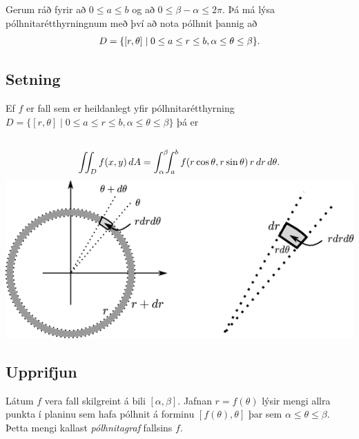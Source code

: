 \documentclass[a4paper,10pt,icelandic]{sphinxmanual}
\begin{document}
Gerum ráð fyrir að \(0\leq a\leq b\) og að
\(0\leq\beta-\alpha\leq
2\pi\). Þá má lýsa pólhnitarétthyrningnum með því að nota pólhnit þannig
að
\begin{gather}
\begin{split}\displaystyle D=\{[r,\theta]\mid 0\leq a\leq r\leq b, \alpha\leq \theta\leq\beta\}.\end{split}\notag
\end{gather}

\subsection{Setning}
\label{Kafli4:id11}
Ef \(f\) er fall sem er heildanlegt yfir pólhnitarétthyrning
\(D=\{[r,\theta]\mid 0\leq a\leq r\leq b, \alpha\leq \theta\leq\beta\}\)
þá er
\begin{gather}
\begin{split}\displaystyle\end{split}\notag\\\begin{split}\int\!\!\!\int_D f(x,y)\,dA=\int_\alpha^\beta\!\!\!\int_{a}^{b}
f(r\cos\theta,r\sin\theta)\,r\,dr\, d\theta.\end{split}\notag
\end{gather}
{\hfill\includegraphics[width=0.900\linewidth]{polarelement.png}\hfill}


\subsection{Upprifjun}
\label{Kafli4:id12}
Látum \(f\) vera fall skilgreint á bili \([\alpha,\beta]\).
Jafnan \(r=f(\theta)\) lýsir mengi allra punkta í planinu sem hafa
pólhnit á forminu \([f(\theta),\theta]\) þar sem
\(\alpha\leq\theta\leq\beta\). Þetta mengi kallast \emph{pólhnitagraf}
fallsins \(f\).
\end{document}

